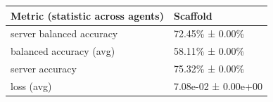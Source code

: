 \begin{tabular}{ll}
\hline
 Metric (statistic across agents)   & Scaffold            \\
\hline
 server balanced accuracy           & 72.45\% ± 0.00\%      \\
 balanced accuracy (avg)            & 58.11\% ± 0.00\%      \\
 server accuracy                    & 75.32\% ± 0.00\%      \\
 loss (avg)                         & 7.08e-02 ± 0.00e+00 \\
\hline
\end{tabular}